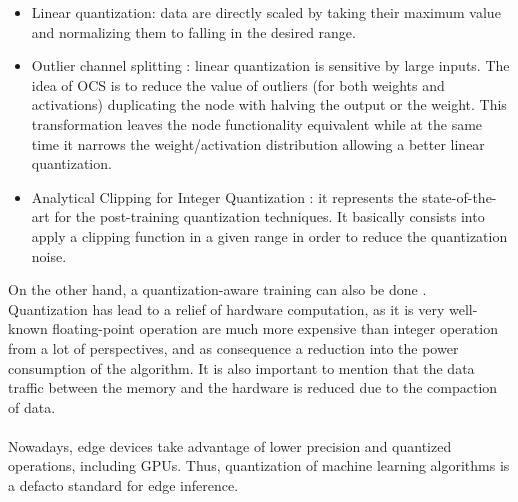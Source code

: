 \begin{itemize}
\item Linear quantization: data are directly scaled by taking their maximum value and normalizing them to falling in the desired range.
\item Outlier channel splitting \cite{paper:46} : linear quantization is sensitive by large inputs. The idea of OCS is to reduce the value of outliers (for both weights and activations) duplicating the node with halving the output or the weight. This transformation leaves the node functionality equivalent while at the same time it narrows the weight/activation distribution allowing a better linear quantization.
\item Analytical Clipping for Integer Quantization \cite{paper:47}: it represents the state-of-the-art for the post-training quantization techniques. It basically consists into apply a clipping function in a given range in order to reduce the quantization noise.
\end{itemize}

On the other hand, a quantization-aware training can also be done \cite{paper:45}.\\
Quantization has lead to a relief of hardware computation, as it is very well-known floating-point operation are much more expensive than integer operation from a lot of perspectives, and as consequence a reduction into the power consumption of the algorithm. It is also important to mention that the data traffic between the memory and the hardware is reduced due to the compaction of data.\\\\

Nowadays, edge devices take advantage of lower precision and quantized operations, including GPUs. Thus, quantization of machine learning algorithms is a defacto standard for edge inference.


